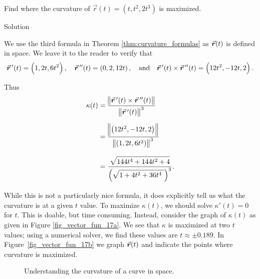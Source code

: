 \begin{example}\label{ex_curvature4}
Find where the curvature of $\vec r(t) = \left( t, t^2, 2t^3\right) $ is maximized.

Solution 

We use the third formula in Theorem \ref{thm:curvature_formulas} as $\vrt$ is defined in space. We leave it to the reader to verify that 
$$\vrp(t) =\left( 1,2t,6t^2\right),\quad \vrp'(t) = \left( 0,2,12t\right),\quad \text{and}\quad \vrp(t)\times \vrp'(t) = \left( 12t^2,-12t,2\right).$$

Thus 
\allowdisplaybreaks
\begin{align*}
\kappa(t) &= \frac{\norm{\vrp(t)\times\vrp'(t)}}{\norm{\vrp(t)}^3} \\[0.2cm]
				&= \rule{0pt}{20pt}\frac{\norm{\left( 12t^2,-12t,2\right)}}{\norm{\left( 1,2t,6t^2\right)}^3} \\[0.2cm]
				&= \rule{0pt}{20pt}\frac{\sqrt{\rule{0pt}{8.5pt}144t^4+144t^2+4}}{\left(\sqrt{\rule{0pt}{8.5pt}1+4t^2+36t^4\ }\right)^3}.\\[0.2cm]
\end{align*}
While this is not a particularly nice formula, it does explicitly tell us what the curvature is at a given $t$ value. To maximize $\kappa(t)$, we should solve $\kappa'(t)=0$ for $t$. This is doable, but  time consuming. Instead, consider the graph of $\kappa(t)$ as given in Figure \ref{fig_vector_fun_17a}. We see that $\kappa$ is maximized at two $t$ values; using a numerical solver, we find these values are $t\approx\pm 0.189$. In Figure~\ref{fig_vector_fun_17b} we graph $\vrt$ and indicate the points where curvature is maximized.

\begin{figure}[H]
\centering
\centerline{
\hspace{0.1cm}
}
\caption{Understanding the curvature of a curve in space.}
\end{figure}

\end{example}


